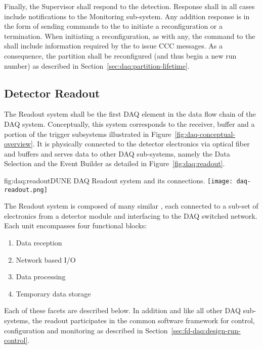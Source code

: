 Finally, the Supervisor shall respond to the detection. 
Response shall in all cases include notifications to the Monitoring sub-system. 
Any addition response is in the form of sending commands to the  to initiate a reconfiguration or a termination. 
When initiating a reconfiguration, as with any, the command to the  shall include information required by the  to issue CCC messages. 
As a consequence, the partition shall be reconfigured (and thus begin a new run number) as described in Section~\ref{sec:daq:partition-lifetime}.


\subsection{Detector Readout}
\label{sec:fd-daq:readout}

The Readout system shall be the first DAQ element in the data flow chain of the DAQ system.
Conceptually, this system corresponds to the receiver, buffer and a portion of the trigger subsystems illustrated in Figure~\ref{fig:daq-conceptual-overview}.
It is physically connected to the detector electronics via optical fiber and buffers and serves data to other DAQ sub-systems, namely the Data Selection and the Event Builder as detailed in Figure~\ref{fig:daq:readout}.

\begin{dunefigure}{fig:daq:readout}{DUNE DAQ Readout system and its connections.}
  \texttt{[image: daq-readout.png]}
\end{dunefigure}

The Readout system is composed of many similar , each connected to a sub-set of electronics from a detector module and interfacing to the DAQ switched network.  Each unit encompasses four functional blocks:

\begin{enumerate}
\item Data reception
\item Network based I/O
\item Data processing
\item Temporary data storage
\end{enumerate}

Each of these facets are described below.  In addition and like all other DAQ sub-systems, the readout participates in the common software framework for control, configuration and monitoring as described in Section~\ref{sec:fd-daq:design-run-control}.

